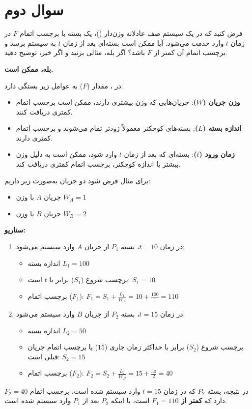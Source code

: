 \section{سوال دوم}

فرض کنید که در یک سیستم صف عادلانه وزن‌دار ()، یک بسته با برچسب اتمام $F$  در زمان $t$ وارد خدمت می‌شود. آیا ممکن است بسته‌ای بعد از زمان $t$ به سیستم برسد و برچسب اتمام آن کمتر از $F$ باشد؟ اگر بله، مثالی بزنید و اگر خیر، توضیح دهید.

\begin{qsolve}
	\textbf{بله، ممکن است.}
	
	
	در ، مقدار (\( F \)) به عوامل زیر بستگی دارد:
	\begin{itemize}
		\item \textbf{وزن جریان (\( W \))}: جریان‌هایی که وزن بیشتری دارند، ممکن است برچسب اتمام کمتری دریافت کنند.
		\item \textbf{اندازه بسته (\( L \))}: بسته‌های کوچکتر معمولاً زودتر تمام می‌شوند و برچسب اتمام کمتری دارند.
		\item \textbf{زمان ورود (\( t \))}: بسته‌ای که بعد از زمان \( t \) وارد شود، ممکن است به دلیل وزن بیشتر یا اندازه کوچکتر، برچسب اتمام کمتری دریافت کند.
	\end{itemize}
	
	
	برای مثال فرض شود دو جریان به‌صورت زیر داریم:
	
	\begin{itemize}
		\item جریان \( A \) با وزن \( W_A = 1 \)
		\item جریان \( B \) با وزن \( W_B = 2 \)
	\end{itemize}
	
	\textbf{سناریو:}
	\begin{enumerate}
		\item در زمان \( t = 10 \)، بسته \( P_1 \) از جریان \( A \) وارد سیستم می‌شود:
		\begin{itemize}
			\item اندازه بسته \( L_1 = 100 \)
			\item برچسب شروع (\( S_1 \)) برابر با \( t \) است: \( S_1 = 10 \)
			\item برچسب اتمام (\( F_1 \)): \( F_1 = S_1 + \frac{L_1}{W_A} = 10 + \frac{100}{1} = 110 \)
		\end{itemize}
		
		\item در زمان \( t = 15 \)، بسته \( P_2 \) از جریان \( B \) وارد سیستم می‌شود:
		\begin{itemize}
			\item اندازه بسته \( L_2 = 50 \)
			\item برچسب شروع (\( S_2 \)) برابر با حداکثر زمان جاری (\( 15 \)) یا برچسب اتمام جریان قبلی است: \( S_2 = 15 \)
			\item برچسب اتمام (\( F_2 \)): \( F_2 = S_2 + \frac{L_2}{W_B} = 15 + \frac{50}{2} = 40 \)
		\end{itemize}
	\end{enumerate}
	
	در نتیجه، بسته \( P_2 \) که در زمان \( t = 15 \) وارد سیستم شده است، برچسب اتمام \( F_2 = 40 \) دارد که \textbf{کمتر از \( F_1 = 110 \)} است، با اینکه \( P_2 \) بعد از \( P_1 \) وارد سیستم شده است.
	
\end{qsolve}